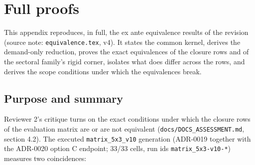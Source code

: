 \section{Full proofs}\label{app:proofs}

\noindent This appendix reproduces, in full, the ex ante equivalence results
of the revision (source note: \texttt{equivalence.tex}, v4). It states the
common kernel, derives the demand-only reduction, proves the exact
equivalences of the closure rows and of the sectoral family's rigid corner,
isolates what does differ across the rows, and derives the scope conditions
under which the equivalences break.

\subsection{Purpose and summary}

Reviewer 2's critique turns on the exact conditions under which the closure
rows of the evaluation matrix are or are not equivalent
(\texttt{docs/DOCS\_ASSESSMENT.md}, section 4.2). The executed
\texttt{matrix\_5x3\_v10} generation (ADR-0019 together
with the ADR-0020 option C endpoint; 33/33 cells, run ids
\texttt{matrix\_5x3-v10-*}) measures two coincidences:

